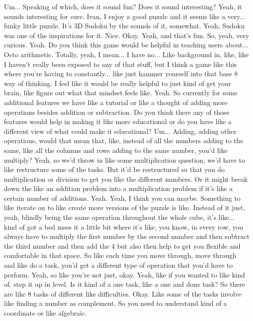 \documentclass{article}
\begin{document}
Um...
Speaking of which, does it sound fun? Does it sound interesting? Yeah, it sounds interesting for sure. Ivan, I enjoy a good puzzle and it seems like a very...
funky little puzzle. It's 3D Sudoku by the sounds of it, somewhat. Yeah, Sudoku was one of the inspirations for it. Nice. Okay. Yeah, and that's fun. So, yeah, very curious. Yeah. Do you think this game would be helpful in teaching users about...
Octo arithmetic. Totally, yeah, I mean...
I have no...
Like background in, like, like I haven't really been exposed to any of that stuff, but I think a game like this where you're having to constantly...
like just hammer yourself into that base 8 way of thinking. I feel like it would be really helpful to just kind of get your brain, like figure out what that mindset feels like. Yeah.
So currently for some additional features we have like a tutorial or like a thought of adding more operations besides addition or subtraction. Do you think there any of those features would help in making it like more educational or do you have like a different view of what could make it educational?
Um...
Adding, adding other operations, would that mean that, like, instead of all the numbers adding to the same, like all the columns and rows adding to the same number, you'd like multiply? Yeah, so we'd throw in like some multiplication question, we'd have to like restructure some of the tasks.
But it'd be restructured so that you do multiplication or division to get you like the different numbers. Or it might break down the like an addition problem into a multiplication problem if it's like a certain number of additions. Yeah.
Yeah, I think you can maybe.
Something to like iterate on to like create more versions of the puzzle is like.
Instead of it just, yeah, blindly being the same operation throughout the whole cube, it's like...
kind of got a bed mess it a little bit where it's like, you know, in every row, you always have to multiply the first number by the second number and then subtract the third number and then add the 4%
but also then help to get you flexible and comfortable in that space. So like each time you move through, move through and like do a task, you'd get a different type of operation that you'd have to perform. Yeah, so like you're not just, okay. Yeah, like if you wanted to like kind of.
step it up in level. Is it kind of a one task, like a one and done task? So there are like 8 tasks of different like difficulties. Okay. Like some of the tasks involve like finding a number as complement. So you need to understand kind of a coordinate or like algebraic.
\end{document}
